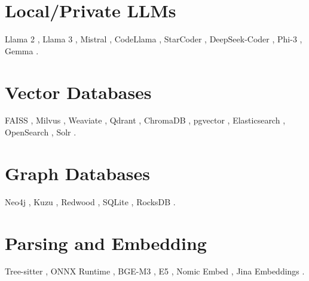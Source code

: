 \section{Local/Private LLMs}
Llama 2 \cite{touvron2023llama2}, Llama 3 \cite{touvron2024llama3}, Mistral \cite{jiang2023mistral}, CodeLlama \cite{roziere2023codellama}, StarCoder \cite{li2023starcoder}, DeepSeek-Coder \cite{guo2024deepseek}, Phi-3 \cite{abdin2024phi3}, Gemma \cite{team2024gemma}.

\section{Vector Databases}
FAISS \cite{johnson2019faiss}, Milvus \cite{milvus2024}, Weaviate \cite{weaviate2024}, Qdrant \cite{qdrant2024}, ChromaDB \cite{chromadb2024}, pgvector \cite{pgvector2024}, Elasticsearch \cite{elasticsearch2024}, OpenSearch \cite{opensearch2024}, Solr \cite{solr2024}.

\section{Graph Databases}
Neo4j \cite{webber2010neo4j}, Kuzu \cite{simon2024kuzu}, Redwood \cite{silevitch2024redwood}, SQLite \cite{bradley2024sqlite}, RocksDB \cite{sigel2019rocksdb}.

\section{Parsing and Embedding}
Tree-sitter \cite{tree-sitter2024}, ONNX Runtime \cite{onnx2024}, BGE-M3 \cite{xiao2023bge}, E5 \cite{wang2024e5}, Nomic Embed \cite{nomic2024nomic}, Jina Embeddings \cite{jina2024jina}.

